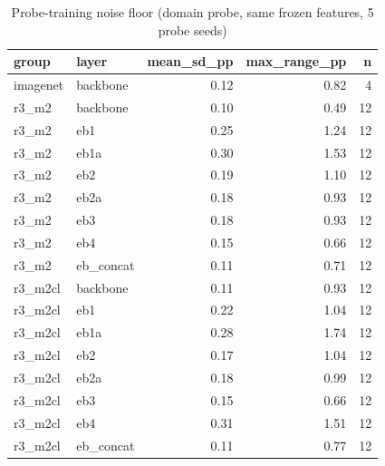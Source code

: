 \begin{table}
\caption{Probe-training noise floor (domain probe, same frozen features, 5 probe seeds)}
\label{tab:leak_noise_floor}
\begin{tabular}{llrrr}
\toprule
group & layer & mean\_sd\_pp & max\_range\_pp & n \\
\midrule
imagenet & backbone & 0.12 & 0.82 & 4 \\
r3\_m2 & backbone & 0.10 & 0.49 & 12 \\
r3\_m2 & eb1 & 0.25 & 1.24 & 12 \\
r3\_m2 & eb1a & 0.30 & 1.53 & 12 \\
r3\_m2 & eb2 & 0.19 & 1.10 & 12 \\
r3\_m2 & eb2a & 0.18 & 0.93 & 12 \\
r3\_m2 & eb3 & 0.18 & 0.93 & 12 \\
r3\_m2 & eb4 & 0.15 & 0.66 & 12 \\
r3\_m2 & eb\_concat & 0.11 & 0.71 & 12 \\
r3\_m2cl & backbone & 0.11 & 0.93 & 12 \\
r3\_m2cl & eb1 & 0.22 & 1.04 & 12 \\
r3\_m2cl & eb1a & 0.28 & 1.74 & 12 \\
r3\_m2cl & eb2 & 0.17 & 1.04 & 12 \\
r3\_m2cl & eb2a & 0.18 & 0.99 & 12 \\
r3\_m2cl & eb3 & 0.15 & 0.66 & 12 \\
r3\_m2cl & eb4 & 0.31 & 1.51 & 12 \\
r3\_m2cl & eb\_concat & 0.11 & 0.77 & 12 \\
\bottomrule
\end{tabular}
\end{table}
